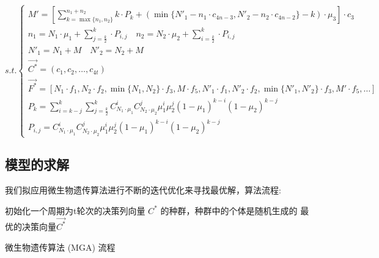 \documentclass[withoutpreface,bwprint]{cumcmthesis} %
\begin{document}
\begin{equation*}
	s.t.\begin{cases}
		M'=[\sum_{k=\max \{n_{1},n_{2}\}}^{n_{1}+n_{2}}k\cdot P_{k}+(\min \{N'_{1}-n_{1}\cdot c_{4n-3},N'_{2}-n_{2}\cdot c_{4n-2}\}-k)\cdot \mu_{3}]\cdot c_{3}                                \\
		n_{1}=N_{1}\cdot \mu_{1}+\sum_{j=\frac{k}{2}}^{k}\cdot P_{i,j} \quad n_{2}=N_{2}\cdot \mu_{2}+\sum_{i=\frac{k}{2}}^{k}\cdot P_{i,j}                                                    \\
		N'_{1}=N_{1}+M \quad N'_{2}=N_{2}+M                                                                                                                                                    \\
		\vec{C^{*}}=(c_{1},c_{2},\dots,c_{4t})                                                                                                                                                 \\
		\vec{F^{*}}=[N_{1}\cdot f_{1},N_{2}\cdot f_{2},\min \{N_{1},N_{2}\}\cdot f_{3},M\cdot f_{5},N'_{1}\cdot f_{1},N'_{2}\cdot f_{2},\min \{N'_{1},N'_{2}\}\cdot f_{3},M'\cdot f_{5},\dots] \\
		P_{k}=\sum_{i=k-j}^{k}\sum_{j=\frac{k}{2}}^{k}C_{N_{1}\cdot\mu_{1}}^{i}C_{N_{2}\cdot\mu_{2}}^{j}\mu_{1}^{i}\mu_{2}^{j}(1-\mu_{1})^{k-i}(1-\mu_{2})^{k-j}                               \\
		P_{i,j}=C_{N_{1}\cdot\mu_{1}}^{i}C_{N_{2}\cdot\mu_{2}}^{j}\mu_{1}^{i}\mu_{2}^{j}(1-\mu_{1})^{k-i}(1-\mu_{2})^{k-j}
	\end{cases}
\end{equation*}
\subsection{模型的求解}
我们拟应用微生物遗传算法进行不断的迭代优化来寻找最优解，算法流程:

\begin{adjustbox}{width=16cm,height=6.5cm}
	\centering
	\begin{algorithm}[H]
		\SetAlgoLined
		初始化一个周期为t轮次的决策列向量 $C^{*}$ 的种群，种群中的个体是随机生成的\;
		\Return 最优的决策向量$\vec{C^{*}}$
		\caption{微生物遗传算法 (MGA) 流程}
	\end{algorithm}
\end{adjustbox}
\end{document}
